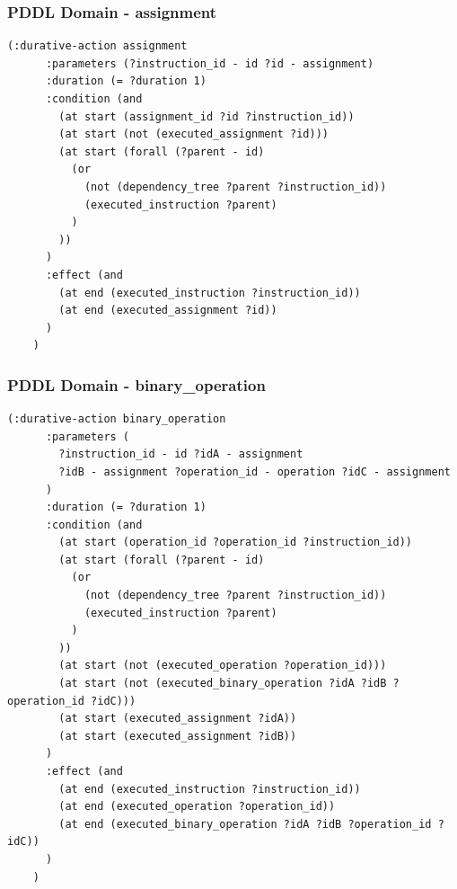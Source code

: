 \documentclass{beamer}
\begin{document}
\begin{frame}[fragile]
  \frametitle{PDDL Domain - assignment}

  \begin{lstlisting}[style=pddlStyle,basicstyle=\ttfamily\fontsize{10pt}{10pt}\selectfont]
    (:durative-action assignment
      :parameters (?instruction_id - id ?id - assignment)
      :duration (= ?duration 1)
      :condition (and
        (at start (assignment_id ?id ?instruction_id))
        (at start (not (executed_assignment ?id)))
        (at start (forall (?parent - id)
          (or
            (not (dependency_tree ?parent ?instruction_id))
            (executed_instruction ?parent)
          )
        ))
      )
      :effect (and
        (at end (executed_instruction ?instruction_id))
        (at end (executed_assignment ?id))
      )
    )
  \end{lstlisting}
\end{frame}

\begin{frame}[fragile]
  \frametitle{PDDL Domain - binary\_operation}

  \begin{lstlisting}[style=pddlStyle,basicstyle=\ttfamily\fontsize{8pt}{8pt}\selectfont]
    (:durative-action binary_operation
      :parameters (
        ?instruction_id - id ?idA - assignment
        ?idB - assignment ?operation_id - operation ?idC - assignment
      )
      :duration (= ?duration 1)
      :condition (and
        (at start (operation_id ?operation_id ?instruction_id))
        (at start (forall (?parent - id)
          (or
            (not (dependency_tree ?parent ?instruction_id))
            (executed_instruction ?parent)
          )
        ))
        (at start (not (executed_operation ?operation_id)))
        (at start (not (executed_binary_operation ?idA ?idB ?operation_id ?idC)))
        (at start (executed_assignment ?idA))
        (at start (executed_assignment ?idB))
      )
      :effect (and
        (at end (executed_instruction ?instruction_id))
        (at end (executed_operation ?operation_id))
        (at end (executed_binary_operation ?idA ?idB ?operation_id ?idC))
      )
    )
  \end{lstlisting}
\end{frame}
\end{document}
